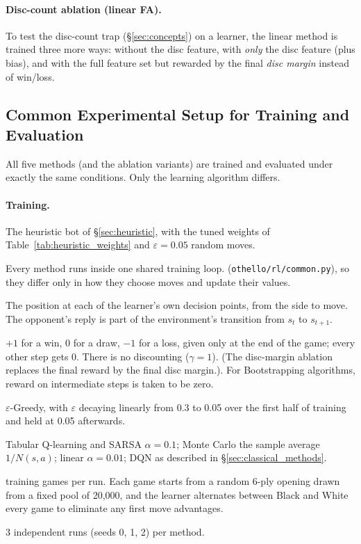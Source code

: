 \documentclass[11pt]{article}
\begin{document}
\paragraph{Disc-count ablation (linear FA).} To test the disc-count trap
(\S\ref{sec:concepts}) on a learner, the linear method is trained three more
ways: without the disc feature, with \emph{only} the disc feature (plus bias),
and with the full feature set but rewarded by the final \emph{disc margin}
instead of win/loss.

\subsection{Common Experimental Setup for Training and Evaluation}
\label{sec:classical_setup}

All five methods (and the ablation variants) are trained and evaluated under
exactly the same conditions. Only the learning algorithm differs.

\paragraph{Training.}
\begin{description}[leftmargin=1.2em,style=nextline,itemsep=2pt]
  \item[Common opponent:] The heuristic bot of \S\ref{sec:heuristic}, with the
        tuned weights of Table~\ref{tab:heuristic_weights} and
        $\varepsilon=0.05$ random moves.
  \item[Training algorithm:] Every
        method runs inside one shared training loop.
        (\texttt{othello/rl/common.py}), so they differ only in how they choose
        moves and update their values.
  \item[Learner's view (state):] The position at each of the learner's own
        decision points, from the side to move. The opponent's reply is part of
        the environment's transition from $s_t$ to $s_{t+1}$.
  \item[Reward:] $+1$ for a win, $0$ for a draw, $-1$ for a loss, given only at
        the end of the game; every other step gets $0$. There is no discounting
        ($\gamma=1$). (The disc-margin ablation replaces the final reward by the
        final disc margin.). For Bootstrapping algorithms, reward on intermediate steps is taken to be zero.
  \item[Exploration:] $\varepsilon$-Greedy, with $\varepsilon$ decaying linearly
        from 0.3 to 0.05 over the first half of training and held at 0.05
        afterwards.
  \item[Step sizes:] Tabular Q-learning and SARSA $\alpha=0.1$; Monte Carlo the
        sample average $1/N(s,a)$; linear $\alpha=0.01$; DQN as described in
        \S\ref{sec:classical_methods}.
  \item[Games and openings:] \TrainGames{} training games per run. Each game
        starts from a random 6-ply opening drawn from a fixed pool of 20{,}000,
        and the learner alternates between Black and White every game to eliminate any first move advantages.
  \item[Seeds:] 3 independent runs (seeds 0, 1, 2) per method.
\end{description}
\end{document}
